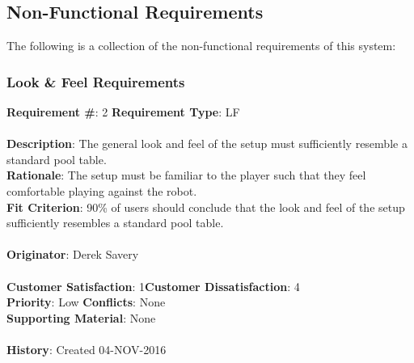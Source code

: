 \documentclass[titlepage]{article}
\begin{document}
\newpage
\subsection{Non-Functional Requirements}
The following is a collection of the non-functional requirements of this system:
\subsubsection{Look \& Feel Requirements}
\begin{framed}
	\noindent\textbf{Requirement \#}: 2 \hfill \textbf{Requirement Type}: LF \hfill\\\\
	\noindent\textbf{Description}: The general look and feel of the setup must sufficiently resemble a standard pool table.\\
	\textbf{Rationale}: The setup must be familiar to the player such that they feel comfortable playing against the robot. \\
	\textbf{Fit Criterion}: 90\% of users should conclude that the look and feel of the setup sufficiently resembles a standard pool table.\\\\
	\textbf{Originator}: Derek Savery\\\\
	\noindent\textbf{Customer Satisfaction}: 1\hfill 	\textbf{Customer Dissatisfaction}: 4 \hfill\\
	\textbf{Priority}: Low \hfill \textbf{Conflicts}: None \hfill\\
	\textbf{Supporting Material}: None\\\\
	\noindent\textbf{History}: Created 04-NOV-2016
\end{framed}
\end{document}
